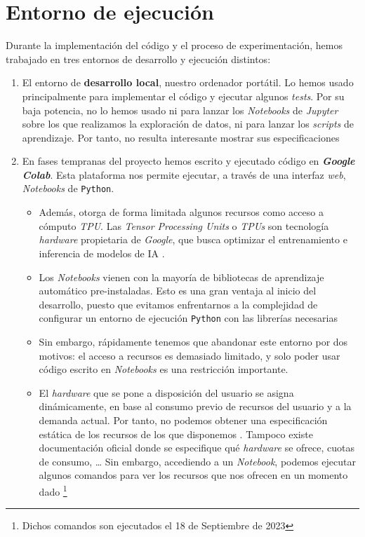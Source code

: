 \section{Entorno de ejecución} \label{isec:entorno_ejecucion}

Durante la implementación del código y el proceso de experimentación, hemos trabajado en tres entornos de desarrollo y ejecución distintos:

\begin{enumerate}
    \item El entorno de \textbf{desarrollo local}, nuestro ordenador portátil. Lo hemos usado principalmente para implementar el código y ejecutar algunos \textit{tests}. Por su baja potencia, no lo hemos usado ni para lanzar los \textit{Notebooks} de \textit{Jupyter} sobre los que realizamos la exploración de datos, ni para lanzar los \textit{scripts} de aprendizaje. Por tanto, no resulta interesante mostrar sus especificaciones

    \item En fases tempranas del proyecto hemos escrito y ejecutado código en \textbf{\textit{Google Colab}}. Esta plataforma nos permite ejecutar, a través de una interfaz \textit{web}, \textit{Notebooks} de \lstinline{Python}.

        \begin{itemize}
            \item Además, otorga de forma limitada algunos recursos como acceso a cómputo \textit{TPU}. Las \textit{Tensor Processing Units} o \textit{TPUs} son tecnología \textit{hardware} propietaria de \textit{Google}, que busca optimizar el entrenamiento e inferencia de modelos de IA \cite{informatica:google_tpu}.

            \item Los \textit{Notebooks} vienen con la mayoría de bibliotecas de aprendizaje automático pre-instaladas. Esto es una gran ventaja al inicio del desarrollo, puesto que evitamos enfrentarnos a la complejidad de configurar un entorno de ejecución \lstinline{Python} con las librerías necesarias

            \item Sin embargo, rápidamente tenemos que abandonar este entorno por dos motivos: el acceso a recursos es demasiado limitado, y solo poder usar código escrito en \textit{Notebooks} es una restricción importante.

            \item El \textit{hardware} que se pone a disposición del usuario se asigna dinámicamente, en base al consumo previo de recursos del usuario y a la demanda actual. Por tanto, no podemos obtener una especificación estática de los recursos de los que disponemos \cite{informatica:google_colab_faq}. Tampoco existe documentación oficial donde se especifique qué \textit{hardware} se ofrece, cuotas de consumo, \ldots\; Sin embargo, accediendo a un \textit{Notebook}, podemos ejecutar algunos comandos para ver los recursos que nos ofrecen en un momento dado \footnote{Dichos comandos son ejecutados el 18 de Septiembre de 2023}


\end{itemize}
\end{enumerate}
